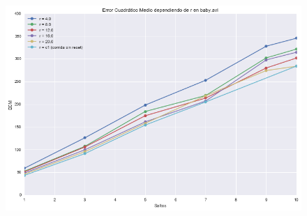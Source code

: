 \begin{figure}[H]
\centering
\includegraphics[width=.95\textwidth]{graficos/ecm_reset.png}
\end{figure}
